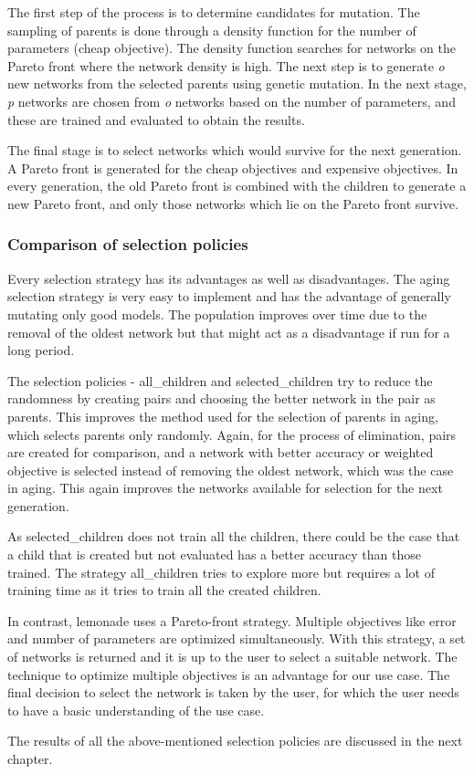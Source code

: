 The first step of the process is to determine candidates for mutation. The sampling of parents is done through a density function for the number of parameters (cheap objective). The density function searches for networks on the Pareto front where the network density is high. The next step is to generate \textit{o} new networks from the selected parents using genetic mutation. In the next stage, \textit{p} networks are chosen from \textit{o} networks based on the number of parameters, and these are trained and evaluated to obtain the results.

The final stage is to select networks which would survive for the next generation. A Pareto front is generated for the cheap objectives and expensive objectives. In every generation, the old Pareto front is combined with the children to generate a new Pareto front, and only those networks which lie on the Pareto front survive.

\subsubsection{Comparison of selection policies}

Every selection strategy has its advantages as well as disadvantages. The aging selection strategy is very easy to implement and has the advantage of generally mutating only good models. The population improves over time due to the removal of the oldest network but that might act as a disadvantage if run for a long period.

The selection policies - all\_children and selected\_children try to reduce the randomness by creating pairs and choosing the better network in the pair as parents. This improves the method used for the selection of parents in aging, which selects parents only randomly. Again, for the process of elimination, pairs are created for comparison, and a network with better accuracy or weighted objective is selected instead of removing the oldest network, which was the case in aging. This again improves the networks available for selection for the next generation. 

As selected\_children does not train all the children, there could be the case that a child that is created but not evaluated has a better accuracy than those trained. The strategy all\_children tries to explore more but requires a lot of training time as it tries to train all the created children.

In contrast, lemonade uses a Pareto-front strategy. Multiple objectives like error and number of parameters are optimized simultaneously. With this strategy, a set of networks is returned and it is up to the user to select a suitable network. The technique to optimize multiple objectives is an advantage for our use case. The final decision to select the network is taken by the user, for which the user needs to have a basic understanding of the use case. 

The results of all the above-mentioned selection policies are discussed in the next chapter.